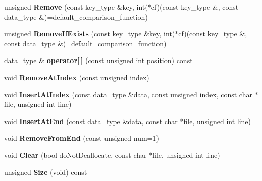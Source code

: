 \begin{DoxyCompactItemize}
\item 
\hypertarget{class_data_structures_1_1_ordered_list_a668f026293db98ed4e68301077fb585a}{unsigned {\bfseries Remove} (const key\-\_\-type \&key, int($\ast$cf)(const key\-\_\-type \&, const data\-\_\-type \&)=default\-\_\-comparison\-\_\-function)}\label{class_data_structures_1_1_ordered_list_a668f026293db98ed4e68301077fb585a}

\item 
\hypertarget{class_data_structures_1_1_ordered_list_a5c05db993081fec4efcd3fd6f3eb34e2}{unsigned {\bfseries Remove\-If\-Exists} (const key\-\_\-type \&key, int($\ast$cf)(const key\-\_\-type \&, const data\-\_\-type \&)=default\-\_\-comparison\-\_\-function)}\label{class_data_structures_1_1_ordered_list_a5c05db993081fec4efcd3fd6f3eb34e2}

\item 
\hypertarget{class_data_structures_1_1_ordered_list_a59527cb330c873e4aadcae82acbb067a}{data\-\_\-type \& {\bfseries operator\mbox{[}$\,$\mbox{]}} (const unsigned int position) const }\label{class_data_structures_1_1_ordered_list_a59527cb330c873e4aadcae82acbb067a}

\item 
\hypertarget{class_data_structures_1_1_ordered_list_a65ef0eca14deb8698004b1cd074b6f0a}{void {\bfseries Remove\-At\-Index} (const unsigned index)}\label{class_data_structures_1_1_ordered_list_a65ef0eca14deb8698004b1cd074b6f0a}

\item 
\hypertarget{class_data_structures_1_1_ordered_list_a9ed08b2c35b20d08ebfab17927f5c4a2}{void {\bfseries Insert\-At\-Index} (const data\-\_\-type \&data, const unsigned index, const char $\ast$file, unsigned int line)}\label{class_data_structures_1_1_ordered_list_a9ed08b2c35b20d08ebfab17927f5c4a2}

\item 
\hypertarget{class_data_structures_1_1_ordered_list_ac4285dfc63d32eeb9126b97b67a8ce3a}{void {\bfseries Insert\-At\-End} (const data\-\_\-type \&data, const char $\ast$file, unsigned int line)}\label{class_data_structures_1_1_ordered_list_ac4285dfc63d32eeb9126b97b67a8ce3a}

\item 
\hypertarget{class_data_structures_1_1_ordered_list_a198f57b525220448d3a1dd2276c01192}{void {\bfseries Remove\-From\-End} (const unsigned num=1)}\label{class_data_structures_1_1_ordered_list_a198f57b525220448d3a1dd2276c01192}

\item 
\hypertarget{class_data_structures_1_1_ordered_list_ac3d85528ada636cae37a5474cb64b69c}{void {\bfseries Clear} (bool do\-Not\-Deallocate, const char $\ast$file, unsigned int line)}\label{class_data_structures_1_1_ordered_list_ac3d85528ada636cae37a5474cb64b69c}

\item 
\hypertarget{class_data_structures_1_1_ordered_list_ad64cf6af46df6a5e68747740ee2c1fec}{unsigned {\bfseries Size} (void) const }\label{class_data_structures_1_1_ordered_list_ad64cf6af46df6a5e68747740ee2c1fec}

\end{DoxyCompactItemize}
